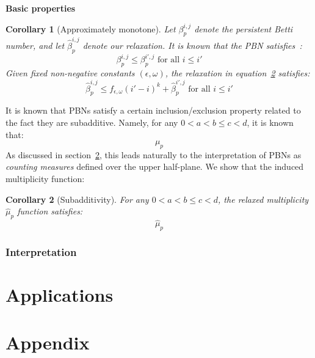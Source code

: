 \documentclass[10pt]{article}
\newcommand{\+}{%
	\raisebox{0.18ex}{\scaleobj{0.55}{+}}
}
\newtheorem{corollary}{Corollary}
\begin{document}
\textbf{Basic properties}
\begin{corollary}[Approximately monotone]
	Let $\beta_p^{i,j}$ denote the persistent Betti number, and let $\hat{\beta}_p^{i,j}$ denote our relaxation. It is known that the PBN satisfies~\cite{}: 
	$$ \beta_p^{i,j} \leq \beta_p^{i',j}  \text{ for all } i \leq i' $$
	Given fixed non-negative constants $(\epsilon, \omega)$, the relaxation in equation~\ref{} satisfies: 
	$$ \hat{\beta}_p^{i,j} \leq f_{\epsilon, \omega}(i' - i)^k  + \hat{\beta}_p^{i',j} \text{ for all } i \leq i'$$
\end{corollary}

It is known that PBNs satisfy a certain inclusion/exclusion property related to the fact they are subadditive. Namely, for any $0 < a < b \leq c < d$, it is known that: 
$$\mu_p^{} $$
As discussed in section~\ref{}, this leads naturally to the interpretation of PBNs as \emph{counting measures} defined over the upper half-plane. We show that the induced multiplicity function:

\begin{corollary}[Subadditivity]
	For any $0 < a < b \leq c < d$, the relaxed multiplicity $\hat{\mu}_p$ function satisfies:
 $$\hat{\mu}_p^{} $$
\end{corollary}


%


\subsubsection*{Interpretation}


\section{Applications}


\appendix
\section{Appendix}
\end{document}
